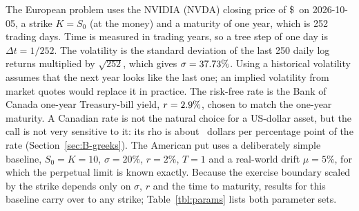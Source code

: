 The European problem uses the NVIDIA (NVDA) closing price of \$\NvdaS\ on 2026-10-05, a strike $K=S_0$ (at the money) and a maturity of one year, which is 252 trading days.
Time is measured in trading years, so a tree step of one day is $\Delta t=1/252$.
The volatility is the standard deviation of the last 250 daily log returns multiplied by $\sqrt{252}$, which gives $\sigma=37.73\%$.
Using a historical volatility assumes that the next year looks like the last one; an implied volatility from market quotes would replace it in practice.
The risk-free rate is the Bank of Canada one-year Treasury-bill yield, $r=2.9\%$, chosen to match the one-year maturity.
A Canadian rate is not the natural choice for a US-dollar asset, but the call is not very sensitive to it: its rho is about \BSrhoPct\ dollars per percentage point of the rate (Section~\ref{sec:B-greeks}).
The American put uses a deliberately simple baseline, $S_0=K=10$, $\sigma=20\%$, $r=2\%$, $T=1$ and a real-world drift $\mu=5\%$, for which the perpetual limit is known exactly.
Because the exercise boundary scaled by the strike depends only on $\sigma$, $r$ and the time to maturity, results for this baseline carry over to any strike; Table~\ref{tbl:params} lists both parameter sets.

